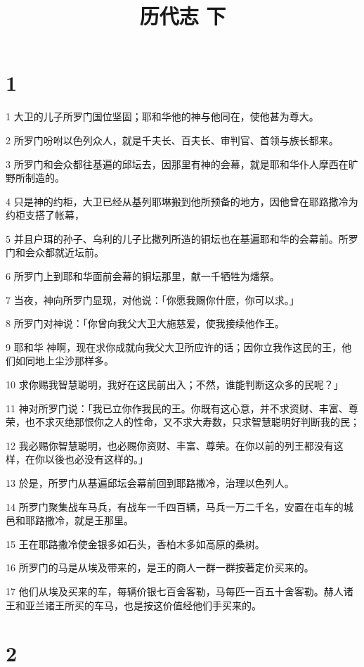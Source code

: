 

\title{历代志 下}


\chapter{1}

\par 1 大卫的儿子所罗门国位坚固；耶和华他的神与他同在，使他甚为尊大。
\par 2 所罗门吩咐以色列众人，就是千夫长、百夫长、审判官、首领与族长都来。
\par 3 所罗门和会众都往基遍的邱坛去，因那里有神的会幕，就是耶和华仆人摩西在旷野所制造的。
\par 4 只是神的约柜，大卫已经从基列耶琳搬到他所预备的地方，因他曾在耶路撒冷为约柜支搭了帐幕，
\par 5 并且户珥的孙子、乌利的儿子比撒列所造的铜坛也在基遍耶和华的会幕前。所罗门和会众都就近坛前。
\par 6 所罗门上到耶和华面前会幕的铜坛那里，献一千牺牲为燔祭。
\par 7 当夜，神向所罗门显现，对他说：「你愿我赐你什麽，你可以求。」
\par 8 所罗门对神说：「你曾向我父大卫大施慈爱，使我接续他作王。
\par 9 耶和华 神啊，现在求你成就向我父大卫所应许的话；因你立我作这民的王，他们如同地上尘沙那样多。
\par 10 求你赐我智慧聪明，我好在这民前出入；不然，谁能判断这众多的民呢？」
\par 11 神对所罗门说：「我已立你作我民的王。你既有这心意，并不求资财、丰富、尊荣，也不求灭绝那恨你之人的性命，又不求大寿数，只求智慧聪明好判断我的民；
\par 12 我必赐你智慧聪明，也必赐你资财、丰富、尊荣。在你以前的列王都没有这样，在你以後也必没有这样的。」
\par 13 於是，所罗门从基遍邱坛会幕前回到耶路撒冷，治理以色列人。
\par 14 所罗门聚集战车马兵，有战车一千四百辆，马兵一万二千名，安置在屯车的城邑和耶路撒冷，就是王那里。
\par 15 王在耶路撒冷使金银多如石头，香柏木多如高原的桑树。
\par 16 所罗门的马是从埃及带来的，是王的商人一群一群按著定价买来的。
\par 17 他们从埃及买来的车，每辆价银七百舍客勒，马每匹一百五十舍客勒。赫人诸王和亚兰诸王所买的车马，也是按这价值经他们手买来的。

\chapter{2}

